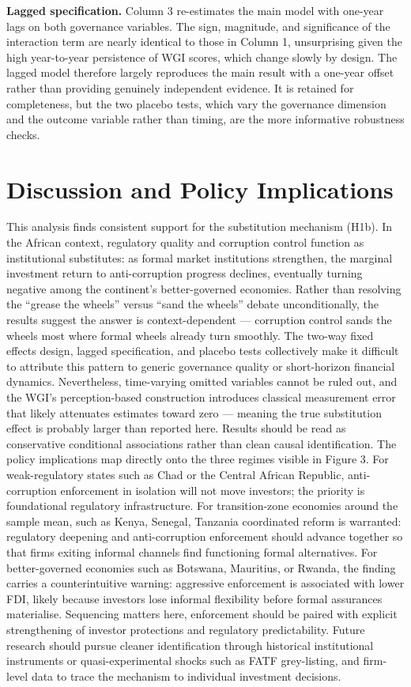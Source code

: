 \documentclass[
  12pt,
  letterpaper,
  DIV=11,
  numbers=noendperiod]{scrartcl}
\begin{document}
\textbf{Lagged specification.} Column 3 re-estimates the main model with
one-year lags on both governance variables. The sign, magnitude, and
significance of the interaction term are nearly identical to those in
Column 1, unsurprising given the high year-to-year persistence of WGI
scores, which change slowly by design. The lagged model therefore
largely reproduces the main result with a one-year offset rather than
providing genuinely independent evidence. It is retained for
completeness, but the two placebo tests, which vary the governance
dimension and the outcome variable rather than timing, are the more
informative robustness checks.

\section{Discussion and Policy
Implications}\label{discussion-and-policy-implications}

This analysis finds consistent support for the substitution mechanism
(H1b). In the African context, regulatory quality and corruption control
function as institutional substitutes: as formal market institutions
strengthen, the marginal investment return to anti-corruption progress
declines, eventually turning negative among the continent's
better-governed economies. Rather than resolving the ``grease the
wheels'' versus ``sand the wheels'' debate unconditionally, the results
suggest the answer is context-dependent --- corruption control sands the
wheels most where formal wheels already turn smoothly. The two-way fixed
effects design, lagged specification, and placebo tests collectively
make it difficult to attribute this pattern to generic governance
quality or short-horizon financial dynamics. Nevertheless, time-varying
omitted variables cannot be ruled out, and the WGI's perception-based
construction introduces classical measurement error that likely
attenuates estimates toward zero --- meaning the true substitution
effect is probably larger than reported here. Results should be read as
conservative conditional associations rather than clean causal
identification. The policy implications map directly onto the three
regimes visible in Figure 3. For weak-regulatory states such as Chad or
the Central African Republic, anti-corruption enforcement in isolation
will not move investors; the priority is foundational regulatory
infrastructure. For transition-zone economies around the sample mean,
such as Kenya, Senegal, Tanzania coordinated reform is warranted:
regulatory deepening and anti-corruption enforcement should advance
together so that firms exiting informal channels find functioning formal
alternatives. For better-governed economies such as Botswana, Mauritius,
or Rwanda, the finding carries a counterintuitive warning: aggressive
enforcement is associated with lower FDI, likely because investors lose
informal flexibility before formal assurances materialise. Sequencing
matters here, enforcement should be paired with explicit strengthening
of investor protections and regulatory predictability. Future research
should pursue cleaner identification through historical institutional
instruments or quasi-experimental shocks such as FATF grey-listing, and
firm-level data to trace the mechanism to individual investment
decisions.
\end{document}
